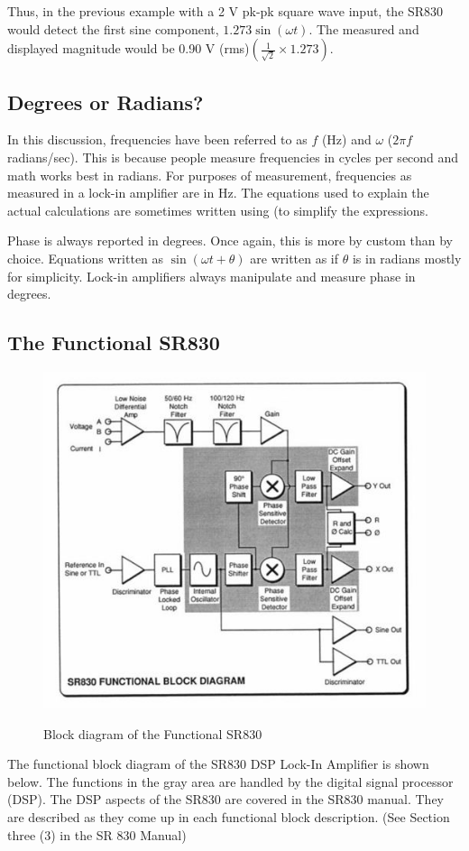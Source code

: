 \documentclass{../lab}
\begin{document}
Thus, in the previous example with a 2 V pk-pk square wave input, the SR830 would detect the first sine component, $1.273 \sin(\omega t)$. The measured and displayed magnitude would be 0.90 V (rms)$\left(\frac{1}{\sqrt{2}} \times 1.273 \right)$.

\subsection{Degrees or Radians?}

In this discussion, frequencies have been referred to as $f$ (Hz) and $\omega$ ($2 \pi f$ radians/sec). This is because people measure frequencies in cycles per second and math works best in radians. For purposes of measurement, frequencies as measured in a lock-in amplifier are in Hz. The equations used to explain the actual calculations are sometimes written using (to simplify the expressions.

Phase is always reported in degrees. Once again, this is more by custom than by choice. Equations written as $\sin(\omega t + \theta)$ are written as if $\theta$ is in radians mostly for simplicity. Lock-in amplifiers always manipulate and measure phase in degrees.

\subsection{The Functional SR830}

\begin{figure}[h]
    \centering
    \href{http://experimentationlab.berkeley.edu/sites/default/files/images/500px-NMR34.jpg}{\includegraphics[width=0.5\linewidth]{images/500px-NMR34.jpg}}
    \caption{Block diagram of the Functional SR830}
    \label{fig:500px-NMR34}
\end{figure}

The functional block diagram of the SR830 DSP Lock-In Amplifier is shown below. The functions in the gray area are handled by the digital signal processor (DSP). The DSP aspects of the SR830 are covered in the SR830 manual. They are described as they come up in each functional block description. (See Section three (3) in the SR 830 Manual)
\end{document}
